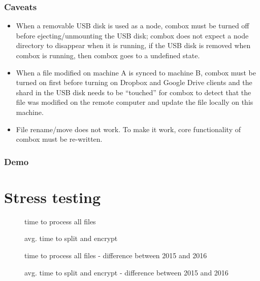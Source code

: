 \subsubsection{Caveats}

\begin{itemize}
\item When a removable USB disk is used as a node, combox must be
  turned off before ejecting/unmounting the USB disk; combox does not
  expect a node directory to disappear when it is running, if the USB
  disk is removed when combox is running, then combox goes to a
  undefined state.

\item When a file modified on machine A is synced to machine B, combox
  must be turned on first before turning on Dropbox and Google Drive
  clients and the shard in the USB disk needs to be ``touched'' for
  combox to detect that the file was modified on the remote computer
  and update the file locally on this machine.

\item File rename/move does not work. To make it work, core
  functionality of combox must be re-written.
\end{itemize}

\subsubsection{Demo}

\section{Stress testing}

\begin{figure}[h]
\centering

\caption{time to process all files}
\end{figure}

\begin{figure}[h]
\centering

\caption{avg. time to split and encrypt}
\end{figure}

\begin{figure}[h]
\centering

\caption{time to process all files - difference between 2015 and 2016}
\end{figure}

\begin{figure}[h]
\centering

\caption{avg. time to split and encrypt - difference between 2015 and 2016}
\end{figure}